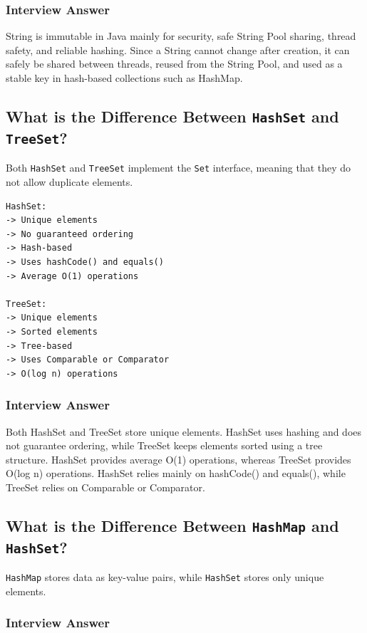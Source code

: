 \documentclass[12pt,a4paper]{article}
\begin{document}
\subsubsection*{Interview Answer}

String is immutable in Java mainly for security, safe String Pool sharing,
thread safety, and reliable hashing. Since a String cannot change after
creation, it can safely be shared between threads, reused from the String
Pool, and used as a stable key in hash-based collections such as HashMap.

\subsection{What is the Difference Between \texttt{HashSet} and \texttt{TreeSet}?}

Both \texttt{HashSet} and \texttt{TreeSet} implement the \texttt{Set}
interface, meaning that they do not allow duplicate elements.

\begin{verbatim}
HashSet:
-> Unique elements
-> No guaranteed ordering
-> Hash-based
-> Uses hashCode() and equals()
-> Average O(1) operations

TreeSet:
-> Unique elements
-> Sorted elements
-> Tree-based
-> Uses Comparable or Comparator
-> O(log n) operations
\end{verbatim}

\subsubsection*{Interview Answer}

Both HashSet and TreeSet store unique elements. HashSet uses hashing and
does not guarantee ordering, while TreeSet keeps elements sorted using a
tree structure. HashSet provides average O(1) operations, whereas TreeSet
provides O(log n) operations. HashSet relies mainly on hashCode() and
equals(), while TreeSet relies on Comparable or Comparator.

\subsection{What is the Difference Between \texttt{HashMap} and \texttt{HashSet}?}

\texttt{HashMap} stores data as key-value pairs, while \texttt{HashSet}
stores only unique elements.

\subsubsection*{Interview Answer}
\end{document}
